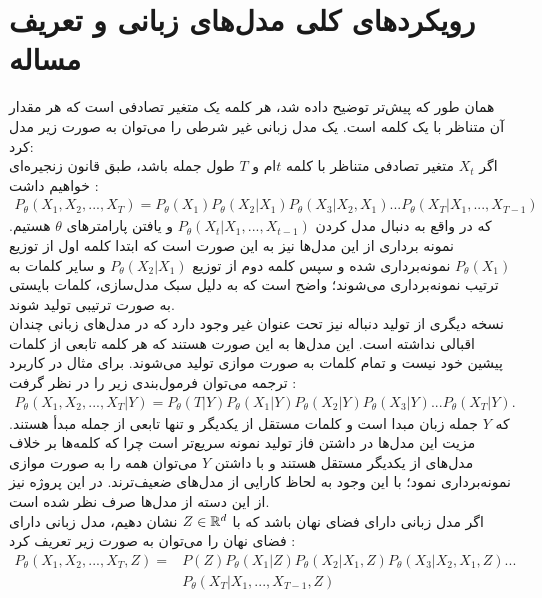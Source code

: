 \section{رویکردهای کلی مدل‌های زبانی و تعریف مساله} \label{chap1:prob_define}
همان طور که پیش‌تر توضیح داده شد، هر کلمه یک متغیر تصادفی است که هر مقدار آن متناظر با یک کلمه است. یک مدل زبانی غیر شرطی \autoregressive{} را می‌توان به صورت زیر مدل کرد:\\
اگر $X_t$ متغیر تصادفی متناظر با کلمه $t$ام و $T$ طول جمله باشد، طبق قانون زنجیره‌ای خواهیم داشت \cite{nonautoregressive}:
\begin{equation}\begin{split}
		P_\theta(X_1, X_2, ... , X_T) = P_\theta(X_1) P_\theta(X_2|X_1) P_\theta(X_3|X_2, X_1) ... P_\theta(X_T|X_1, ..., X_{T-1})
	\end{split}\end{equation}
که در واقع به دنبال مدل کردن $P_\theta(X_t|X_1, ..., X_{t-1 })$ و یافتن پارامتر‌های $\theta$ هستیم. نمونه برداری از این مدل‌ها نیز به این صورت است که ابتدا کلمه اول از توزیع $P_\theta(X_1)$ نمونه‌برداری شده و سپس کلمه دوم از توزیع $P_\theta(X_2|X_1)$ و سایر کلمات به ترتیب نمونه‌برداری می‌شوند؛ واضح است که به دلیل سبک مدل‌سازی، کلمات بایستی به صورت ترتیبی تولید شوند. \\
نسخه دیگری از تولید دنباله نیز تحت عنوان غیر \autoregressive{} وجود دارد که در مدل‌های زبانی چندان اقبالی نداشته است. این مدل‌ها به این صورت هستند که هر کلمه تابعی از کلمات پیشین خود نیست و تمام کلمات به صورت موازی تولید می‌شوند. برای مثال در کاربرد ترجمه می‌توان فرمول‌بندی زیر را در نظر گرفت \cite{nonautoregressive}:
\begin{align}
	P_\theta(X_1, X_2, ... , X_T|Y) = P_\theta(T|Y) P_\theta(X_1|Y) P_\theta(X_2|Y) P_\theta(X_3|Y) ... P_\theta(X_T|Y).
\end{align}
که $Y$ جمله زبان مبدا است و کلمات مستقل از یکدیگر و تنها تابعی از جمله مبدأ هستند. مزیت این مدل‌ها در داشتن فاز تولید نمونه سریع‌تر است چرا که کلمه‌ها بر خلاف مدل‌های \autoregressive{} از یکدیگر مستقل هستند و با داشتن $Y$ می‌توان همه را به صورت موازی نمونه‌برداری نمود؛ با این وجود به لحاظ کارایی از مدل‌های \autoregressive{} ضعیف‌ترند. در این پروژه نیز از این دسته از مدل‌ها صرف نظر شده است.
\\
اگر مدل زبانی دارای فضای نهان باشد که با $Z \in {\mathbb{R}}^d$ نشان دهیم، مدل زبانی \autoregressive{} دارای فضای نهان را می‌توان به صورت زیر تعریف کرد \cite{wasser_text_kl}:
\begin{align}
	P_\theta(X_1, X_2, ... , X_T,Z) = & P(Z) P_\theta(X_1|Z) P_\theta(X_2|X_1,Z) P_\theta(X_3|X_2, X_1,Z) ... \nonumber \\& P_\theta(X_T|X_1, ..., X_{T-1},Z)
\end{align}

